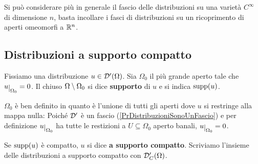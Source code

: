 \begin{remark}
Si pu\`o considerare pi\`u in generale il fascio delle distribuzioni su una variet\`a $C^\infty$ di dimensione $n$, basta incollare i fasci di distribuzioni su un ricoprimento di aperti omeomorfi a $\mathbb{R}^n$.
\end{remark}

\subsection{Distribuzioni a supporto compatto}
\begin{definition}
Fissiamo una distribuzione $u\in \mathcal{D}'(\Omega)$. Sia $\Omega_0$ il pi\`u grande aperto tale che $u\res{\Omega_0}=0$. Il chiuso $\Omega\setminus \Omega_0$ si dice \textbf{supporto} di $u$ e si indica $\operatorname{supp}(u)$.
\end{definition}
\begin{remark}
$\Omega_0$ \`e ben definito in quanto \`e l'unione di tutti gli aperti dove $u$ si restringe alla mappa nulla: Poich\'e $\mathcal{D}'$ \`e un fascio (\ref{PrDistribuzioniSonoUnFascio}) e per definizione $u\res{\Omega_0}$ ha tutte le restizioni a $U\subseteq \Omega_0$ aperto banali, $u\res{\Omega_0}=0$.
\end{remark}

\begin{definition}
Se $\operatorname{supp}(u)$ \`e compatto, $u$ si dice \textbf{a supporto compatto}. Scriviamo l'insieme delle distribuzioni a supporto compatto con $\mathcal{D}'_C(\Omega)$.
\end{definition}

